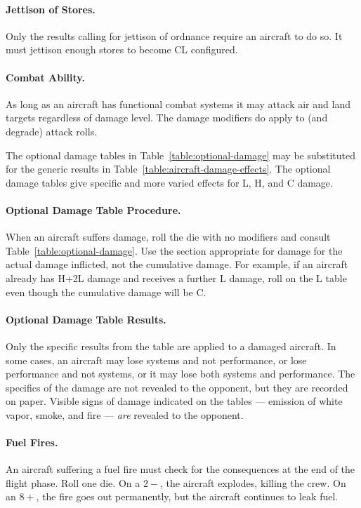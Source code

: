 \begin{advancedrules}
{\paragraph{Jettison of Stores.} Only the results calling for jettison of ordnance require an aircraft to do so. It must jettison enough stores to become CL configured.

\paragraph{Combat Ability.} As long as an aircraft has functional combat systems it may attack air and land targets regardless of damage level. The damage modifiers do apply to (and degrade) attack rolls.

}{

The optional damage tables in Table~\ref{table:optional-damage} may be substituted for the generic results in Table~\ref{table:aircraft-damage-effects}. The optional damage tables give specific and more varied effects for L, H, and C damage. 

\paragraph{Optional Damage Table Procedure.}
When an aircraft suffers damage, roll the die with no modifiers and consult Table~\ref{table:optional-damage}. Use the section appropriate for damage for the actual damage inflicted, not the cumulative damage. For example, if an aircraft already has H+2L damage and receives a further L damage, roll on the L table even though the cumulative damage will be C.

\paragraph{Optional Damage Table Results.} Only the specific results from the table are applied to a damaged aircraft. In some cases, an aircraft may lose systems and not performance, or lose performance and not systems, or it may lose both systems and performance. The specifics of the damage are not revealed to the opponent, but they are recorded on paper. Visible signs of damage indicated on the tables --- emission of white vapor, smoke, and fire --- \emph{are} revealed to the opponent.

\paragraph{Fuel Fires.} 
An aircraft suffering a fuel fire must check for the consequences at the end of the flight phase. Roll one die. On a $2-$, the aircraft explodes, killing the crew. On an $8+$, the fire goes out permanently, but the aircraft continues to leak fuel.

}
\end{advancedrules}
